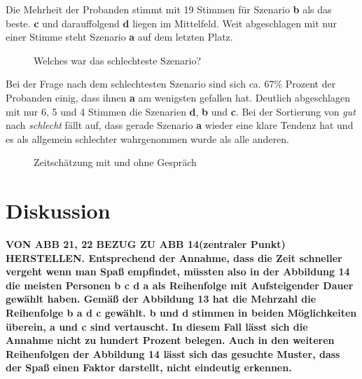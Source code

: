 \documentclass{Paper}
\begin{document}
Die Mehrheit der Probanden stimmt mit 19 Stimmen für Szenario \textbf{b} als das beste. \textbf{c} und darauffolgend \textbf{d} liegen im Mittelfeld. Weit abgeschlagen mit nur einer Stimme steht Szenario \textbf{a} auf dem letzten Platz.
	
	
	\begin{figure}[ht]
\caption{Welches war das schlechteste Szenario?}
\label{SzenarioSchlecht}
\end{figure}
	

Bei der Frage nach dem schlechtesten Szenario sind sich ca. 67\% Prozent der Probanden einig, dass ihnen \textbf{a} am wenigsten gefallen hat. Deutlich abgeschlagen mit nur 6, 5 und 4 Stimmen die Szenarien \textbf{d}, \textbf{b} und \textbf{c}. 
Bei der Sortierung von \textit{gut} nach \textit{schlecht} fällt auf, dass gerade Szenario \textbf{a} wieder eine klare Tendenz hat und es als allgemein schlechter wahrgenommen wurde als alle anderen.


\begin{figure}
\label{time}
\caption{Zeitschätzung mit und ohne Gespräch}
\label{ZeitGeschaetzt}
\end{figure}


\section{Diskussion}
\textbf{VON ABB 21, 22 BEZUG ZU ABB 14(zentraler Punkt) HERSTELLEN. Entsprechend der Annahme, dass die Zeit schneller vergeht wenn man Spaß empfindet, müssten also in der Abbildung 14 die meisten Personen \textbf{b c d a} als Reihenfolge mit Aufsteigender Dauer gewählt haben. Gemäß der Abbildung 13 hat die Mehrzahl die Reihenfolge \textbf{b a d c} gewählt. \textbf{b} und \textbf{d} stimmen in beiden Möglichkeiten überein, \textbf{a} und \textbf{c} sind vertauscht. In diesem Fall lässt sich die Annahme nicht zu hundert Prozent belegen. Auch in den weiteren Reihenfolgen der Abbildung 14 lässt sich das gesuchte Muster, dass der Spaß einen Faktor darstellt, nicht eindeutig erkennen.}
\end{document}
